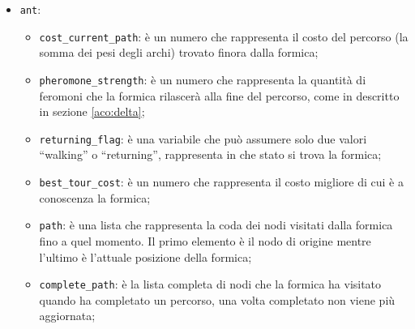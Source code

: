 \begin{itemize}
\begin{itemize}
        \item \texttt{tau}: è un numero che rappresenta la quantità di feromone presente nell'arco;
    \end{itemize}
    \item \texttt{ant}:
    \begin{itemize}
        \item \texttt{cost\_current\_path}: è un numero che rappresenta il costo del percorso (la somma dei pesi degli archi) trovato finora dalla formica;
        \item \texttt{pheromone\_strength}: è un numero che rappresenta la quantità di feromoni che la formica rilascerà alla fine del percorso, come in descritto in sezione \ref{aco:delta};
        \item \texttt{returning\_flag}: è una variabile che può assumere solo due valori ``walking'' o ``returning'', rappresenta in che stato si trova la formica;
        \item \texttt{best\_tour\_cost}: è un numero che rappresenta il costo migliore di cui è a conoscenza la formica;
        \item \texttt{path}: è una lista che rappresenta la coda dei nodi visitati dalla formica fino a quel momento. Il primo elemento è il nodo di origine mentre l'ultimo è l'attuale posizione della formica;
        \item \texttt{complete\_path}: è la lista completa di nodi che la formica ha visitato quando ha completato un percorso, una volta completato non viene più aggiornata;
    \end{itemize}
\end{itemize}

